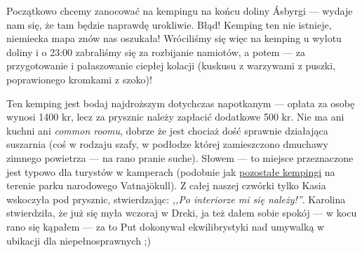 
Początkowo chcemy zanocować na kempingu na końcu doliny Ásbyrgi --- wydaje nam się, że tam będzie naprawdę urokliwie. Błąd! Kemping ten nie istnieje, niemiecka mapa znów nas oszukała! Wróciliśmy się więc na kemping u wylotu doliny i o 23:00 zabraliśmy się za rozbijanie namiotów, a potem --- za przygotowanie i pałaszowanie ciepłej kolacji (kuskusu z warzywami z puszki, poprawionego kromkami z szoko)!

Ten kemping jest bodaj najdroższym dotychczas napotkanym --- opłata za osobę wynosi 1400 kr, lecz za prysznic należy zapłacić dodatkowe 500 kr. Nie ma ani kuchni ani \emph{common roomu}, dobrze że jest chociaż dość sprawnie działająca suszarnia (coś w rodzaju szafy, w podłodze której zamieszczono dmuchawy zimnego powietrza --- na rano pranie suche). Słowem --- to miejsce przeznaczone jest typowo dla turystów w kamperach (podobnie jak \href{http://www.vatnajokulsthjodgardur.is/english/plan-your-visit/camping/}{pozostałe kempingi} na terenie parku narodowego Vatnajökull). Z całej naszej czwórki tylko Kasia wskoczyła pod prysznic, stwierdzając: \emph{,,Po interiorze mi się należy!''}. Karolina stwierdziła, że już się myła wczoraj  w Dreki, ja też dałem sobie spokój --- w kocu rano się kąpałem --- za to Put dokonywał ekwilibrystyki nad umywalką w ubikacji dla niepełnosprawnych ;)

